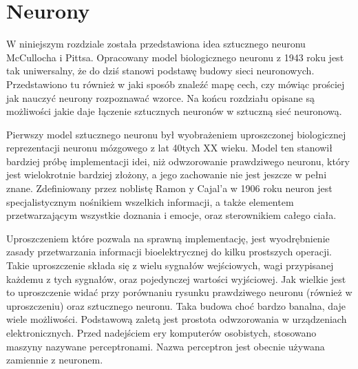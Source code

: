 \documentclass[12pt,a4paper,twoside,titlepage,openright]{book}
\begin{document}
\chapter{Neurony}
W niniejszym rozdziale została przedstawiona idea sztucznego neuronu McCullocha i Pittsa. Opracowany model biologicznego neuronu z 1943 roku jest tak uniwersalny, że do dziś stanowi podstawę budowy sieci neuronowych. Przedstawiono tu również w jaki sposób znaleźć mapę cech, czy mówiąc prościej jak nauczyć neurony rozpoznawać wzorce. Na końcu rozdziału opisane są możliwości jakie daje łączenie sztucznych neuronów w sztuczną sieć neuronową.

Pierwszy model sztucznego neuronu był wyobrażeniem uproszczonej biologicznej reprezentacji neuronu mózgowego z lat 40tych XX wieku. Model ten stanowił bardziej próbę implementacji idei, niż odwzorowanie prawdziwego neuronu, który jest wielokrotnie bardziej złożony, a jego zachowanie nie jest jeszcze w pełni znane. Zdefiniowany przez noblistę Ramon y Cajal'a w 1906 roku neuron jest specjalistycznym nośnikiem wszelkich informacji, a także elementem przetwarzającym wszystkie doznania i emocje, oraz sterownikiem całego ciała.

Uproszczeniem które pozwala na sprawną implementację, jest wyodrębnienie zasady przetwarzania informacji bioelektrycznej do kilku prostszych operacji. Takie uproszczenie składa się z wielu sygnałów wejściowych, wagi przypisanej każdemu z tych sygnałów, oraz pojedynczej wartości wyjściowej. Jak wielkie jest to uproszczenie widać przy porównaniu rysunku prawdziwego neuronu (również w uproszczeniu) oraz sztucznego neuronu. Taka budowa choć bardzo banalna, daje wiele możliwości. Podstawową zaletą jest prostota odwzorowania w urządzeniach elektronicznych. Przed nadejściem ery komputerów osobistych, stosowano maszyny nazywane perceptronami. Nazwa perceptron jest obecnie używana zamiennie z neuronem. \cite{odkrywanieSieci}
\end{document}
